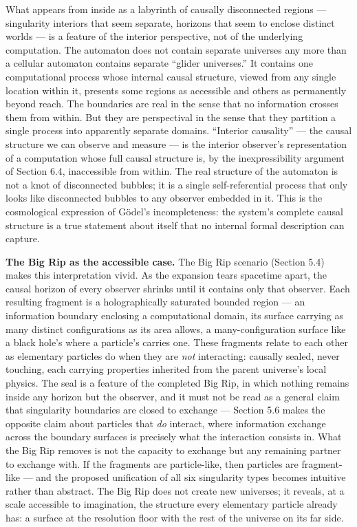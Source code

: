 \documentclass[
]{article}
\begin{document}
What appears from inside as a labyrinth of causally disconnected regions
--- singularity interiors that seem separate, horizons that seem to
enclose distinct worlds --- is a feature of the interior perspective,
not of the underlying computation. The automaton does not contain
separate universes any more than a cellular automaton contains separate
``glider universes.'' It contains one computational process whose
internal causal structure, viewed from any single location within it,
presents some regions as accessible and others as permanently beyond
reach. The boundaries are real in the sense that no information crosses
them from within. But they are perspectival in the sense that they
partition a single process into apparently separate domains. ``Interior
causality'' --- the causal structure we can observe and measure --- is
the interior observer's representation of a computation whose full
causal structure is, by the inexpressibility argument of Section 6.4,
inaccessible from within. The real structure of the automaton is not a
knot of disconnected bubbles; it is a single self-referential process
that only looks like disconnected bubbles to any observer embedded in
it. This is the cosmological expression of Gödel's incompleteness: the
system's complete causal structure is a true statement about itself that
no internal formal description can capture.

\textbf{The Big Rip as the accessible case.} The Big Rip scenario
(Section 5.4) makes this interpretation vivid. As the expansion tears
spacetime apart, the causal horizon of every observer shrinks until it
contains only that observer. Each resulting fragment is a
holographically saturated bounded region --- an information boundary
enclosing a computational domain, its surface carrying as many distinct
configurations as its area allows, a many-configuration surface like a
black hole's where a particle's carries one. These fragments relate to
each other as elementary particles do when they are \emph{not}
interacting: causally sealed, never touching, each carrying properties
inherited from the parent universe's local physics. The seal is a
feature of the completed Big Rip, in which nothing remains inside any
horizon but the observer, and it must not be read as a general claim
that singularity boundaries are closed to exchange --- Section 5.6 makes
the opposite claim about particles that \emph{do} interact, where
information exchange across the boundary surfaces is precisely what the
interaction consists in. What the Big Rip removes is not the capacity to
exchange but any remaining partner to exchange with. If the fragments
are particle-like, then particles are fragment-like --- and the proposed
unification of all six singularity types becomes intuitive rather than
abstract. The Big Rip does not create new universes; it reveals, at a
scale accessible to imagination, the structure every elementary particle
already has: a surface at the resolution floor with the rest of the
universe on its far side.
\end{document}
